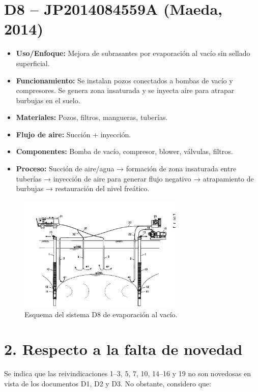 \documentclass[12pt]{article}
\begin{document}
\section*{ D8 – JP2014084559A (Maeda, 2014)}

\begin{itemize}
    \item \textbf{Uso/Enfoque:} Mejora de subrasantes por evaporación al vacío sin sellado superficial.
    \item \textbf{Funcionamiento:} Se instalan pozos conectados a bombas de vacío y compresores. Se genera zona insaturada y se inyecta aire para atrapar burbujas en el suelo.
    \item \textbf{Materiales:} Pozos, filtros, mangueras, tuberías.
    \item \textbf{Flujo de aire:} Succión + inyección.
    \item \textbf{Componentes:} Bomba de vacío, compresor, blower, válvulas, filtros.
    \item \textbf{Proceso:} Succión de aire/agua → formación de zona insaturada entre tuberías → inyección de aire para generar flujo negativo → atrapamiento de burbujas → restauración del nivel freático.
\end{itemize}

\begin{figure}[H]
\centering
\includegraphics[width=0.7\textwidth]{images/d8_maeda.png}
\caption{Esquema del sistema D8 de evaporación al vacío.}
\end{figure}


\section*{2. Respecto a la falta de novedad}

Se indica que las reivindicaciones 1–3, 5, 7, 10, 14–16 y 19 no son novedosas en vista de los documentos D1, D2 y D3. No obstante, considero que:
\end{document}
